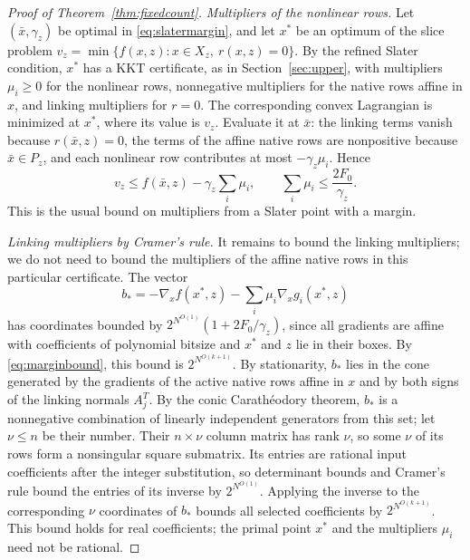 \begin{proof}[Proof of Theorem~\ref{thm:fixedcount}]
\emph{Multipliers of the nonlinear rows.}
Let $(\bar x,\gamma_z)$ be optimal in \eqref{eq:slatermargin}, and let $x^*$ be an optimum of
the slice problem $v_z=\min\{f(x,z):x\in X_z,\ r(x,z)=0\}$. By the refined
Slater condition, $x^*$ has a KKT certificate, as in
Section~\ref{sec:upper}, with multipliers $\mu_i\ge0$ for
the nonlinear rows, nonnegative multipliers for the native rows affine in
$x$, and linking multipliers for $r=0$. The corresponding convex
Lagrangian is minimized at $x^*$, where its value is $v_z$. Evaluate it
at $\bar x$: the linking terms vanish because $r(\bar x,z)=0$, the terms
of the affine native rows are nonpositive because $\bar x\in P_z$, and
each nonlinear row contributes at most $-\gamma_z\mu_i$. Hence
\begin{equation}\label{eq:nonlinearmult}
 v_z\le f(\bar x,z)-\gamma_z\sum_i\mu_i,\qquad
 \sum_i\mu_i\le\frac{2F_0}{\gamma_z}.
\end{equation}
This is the usual bound on multipliers from a Slater point with a margin.

\emph{Linking multipliers by Cramer's rule.}
It remains to bound the linking multipliers; we do not need to bound the
multipliers of the affine native rows in this particular certificate.
The vector
\[
 b_*=-\nabla_xf(x^*,z)-\sum_i\mu_i\nabla_xg_i(x^*,z)
\]
has coordinates bounded by $2^{N^{O(1)}}(1+2F_0/\gamma_z)$, since all
gradients are affine with coefficients of polynomial bitsize and $x^*$
and $z$ lie in their boxes. By \eqref{eq:marginbound}, this bound is
$2^{N^{O(k+1)}}$. By stationarity, $b_*$ lies in the cone generated by
the gradients of the active native rows affine in $x$ and by both signs
of the linking normals $A_j^T$. By the conic Carath\'eodory theorem,
$b_*$ is a nonnegative combination of linearly independent generators
from this set; let $\nu\le n$ be their number. Their $n\times\nu$
column matrix has rank $\nu$, so some $\nu$ of its rows form a nonsingular
square submatrix. Its entries are rational input coefficients after the integer
substitution, so determinant bounds and Cramer's rule bound the entries
of its inverse by $2^{N^{O(1)}}$. Applying the inverse to the
corresponding $\nu$ coordinates of $b_*$ bounds all selected coefficients
by $2^{N^{O(k+1)}}$. This bound holds for real coefficients; the primal
point $x^*$ and the multipliers $\mu_i$ need not be rational.


\end{proof}
